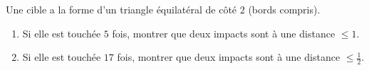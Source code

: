 Une cible a la forme d'un triangle équilatéral de côté $2$ (bords compris).
\begin{enumerate}
  \item[(a)] Si elle est touchée $5$ fois, montrer que deux impacts sont à une
  distance $\leq 1$.
  \item[(b)] Si elle est touchée $17$ fois, montrer que deux impacts sont à une
  distance $\leq \frac{1}{2}$.
\end{enumerate}

